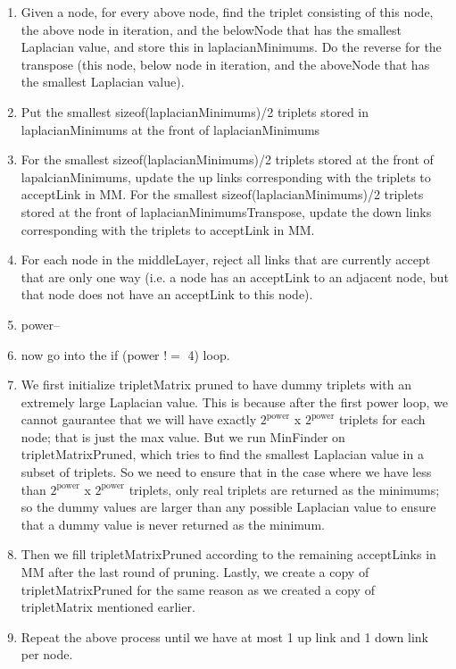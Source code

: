 \documentclass[11pt]{article}
\begin{document}
\begin{enumerate}
	\item Given a node, for every above node, find the triplet consisting of this node, the above node in iteration, and the belowNode that has the smallest Laplacian value, and store this in laplacianMinimums. Do the reverse for the transpose (this node, below node in iteration, and the aboveNode that has the smallest Laplacian value).
	\item Put the smallest sizeof(laplacianMinimums)/2 triplets stored in laplacianMinimums at the front of laplacianMinimums
	\item For the smallest sizeof(laplacianMinimums)/2 triplets stored at the front of lapalcianMinimums, update the up links corresponding with the triplets to acceptLink in MM. For the smallest sizeof(laplacianMinimums)/2 triplets stored at the front of laplacianMinimumsTranspose, update the down links corresponding with the triplets to acceptLink in MM.
	\item For each node in the middleLayer, reject all links that are currently accept that are only one way (i.e. a node has an acceptLink to an adjacent node, but that node does not have an acceptLink to this node).
	\item power--
	\item now go into the if (power $!=$ 4) loop. 
	\item We first initialize tripletMatrix pruned to have dummy triplets with an extremely large Laplacian value. This is because after the first power loop, we cannot gaurantee that we will have exactly $2^{\text{power}}$ x  $2^{\text{power}}$ triplets for each node; that is just the max value. But we run MinFinder on tripletMatrixPruned, which tries to find the smallest Laplacian value in a subset of triplets. So we need to ensure that in the case where we have less than $2^{\text{power}}$ x  $2^{\text{power}}$ triplets, only real triplets are returned as the minimums; so the dummy values are larger than any possible Laplacian value to ensure that a dummy value is never returned as the minimum.
	\item Then we fill tripletMatrixPruned according to the remaining acceptLinks in MM after the last round of pruning. Lastly, we create a copy of tripletMatrixPruned for the same reason as we created a copy of tripletMatrix mentioned earlier.
	\item Repeat the above process until we have at most 1 up link and 1 down link per node.
\end{enumerate}
\end{document}
